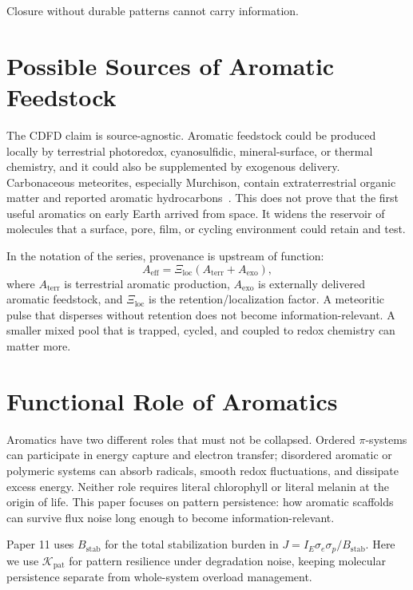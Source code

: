 \documentclass[11pt,a4paper]{article}
\begin{document}
Closure without durable patterns cannot carry information.

\section{Possible Sources of Aromatic Feedstock}
The CDFD claim is source-agnostic. Aromatic feedstock could be produced locally by terrestrial photoredox, cyanosulfidic, mineral-surface, or thermal chemistry, and it could also be supplemented by exogenous delivery. Carbonaceous meteorites, especially Murchison, contain extraterrestrial organic matter and reported aromatic hydrocarbons~\cite{Kvenvolden1970,Pering1971,Oro1971,SchmittKopplin2010}. This does not prove that the first useful aromatics on early Earth arrived from space. It widens the reservoir of molecules that a surface, pore, film, or cycling environment could retain and test.

In the notation of the series, provenance is upstream of function:
\begin{equation}
A_{\mathrm{eff}}
=
\Xi_{\mathrm{loc}}\left(A_{\mathrm{terr}}+A_{\mathrm{exo}}\right),
\end{equation}
where $A_{\mathrm{terr}}$ is terrestrial aromatic production, $A_{\mathrm{exo}}$ is externally delivered aromatic feedstock, and $\Xi_{\mathrm{loc}}$ is the retention/localization factor. A meteoritic pulse that disperses without retention does not become information-relevant. A smaller mixed pool that is trapped, cycled, and coupled to redox chemistry can matter more.

\section{Functional Role of Aromatics}
Aromatics have two different roles that must not be collapsed. Ordered $\pi$-systems can participate in energy capture and electron transfer; disordered aromatic or polymeric systems can absorb radicals, smooth redox fluctuations, and dissipate excess energy. Neither role requires literal chlorophyll or literal melanin at the origin of life. This paper focuses on pattern persistence: how aromatic scaffolds can survive flux noise long enough to become information-relevant.

Paper 11 uses $B_{\mathrm{stab}}$ for the total stabilization burden in $J=I_E\sigma_e\sigma_p/B_{\mathrm{stab}}$. Here we use $\mathcal{K}_{\mathrm{pat}}$ for pattern resilience under degradation noise, keeping molecular persistence separate from whole-system overload management.
\end{document}
